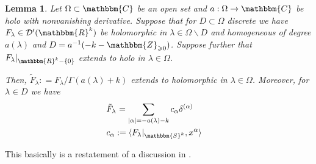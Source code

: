 \documentclass{article}
\newcommand{\assign}{:=}
\numberwithin{definition}{section}
\newtheorem{lemma}{Lemma}
\numberwithin{lemma}{section}
\numberwithin{proposition}{section}
{\theorembodyfont{\rmfamily}\newtheorem{remark}{Remark}
\numberwithin{remark}{section}
}
\begin{document}
\begin{lemma}
  \label{KR-normalization-even:lem-gelfand}Let $\Omega \subset \mathbbm{C}$ be
  an open set and $a : \Omega \rightarrow \mathbbm{C}$ be holo with
  nonvanishing derivative. Suppose that for $D \subset \Omega$ discrete we
  have $F_{\lambda} \in \mathcal{D}' ( \mathbbm{R}^k)$ be holomorphic in
  $\lambda \in \Omega \backslash D$ and homogeneous of degree $a ( \lambda)$
  and $D = a^{- 1} ( - k -\mathbbm{Z}_{\geqslant 0})$. Suppose further that
  $F_{\lambda} |_{\mathbbm{R}^k - \{ 0 \}}$ extends to holo in $\lambda \in
  \Omega$.
  
  Then, $\tilde{F}_{\lambda} : = F_{\lambda} / \Gamma ( a ( \lambda) + k)$
  extends to holomorphic in $\lambda \in \Omega$. Moreover, for $\lambda_{}
  \in D$ we have
  \begin{eqnarray}
    & \tilde{F}_{\lambda_{}} = \sum_{| \alpha | = - a ( \lambda) - k}
    c_{\alpha} \delta^{( \alpha)} &  \nonumber\\
    & c_{\alpha} \assign \langle F_{\lambda} |_{\mathbbm{S}^k}, x^{\alpha}
    \rangle &  \nonumber
  \end{eqnarray}
\end{lemma}

\begin{remark}
  This basically is a restatement of a discussion in
  {\cite[III.{\textsection}3.5]{gelfand1980distribution}}.
\end{remark}
\end{document}

